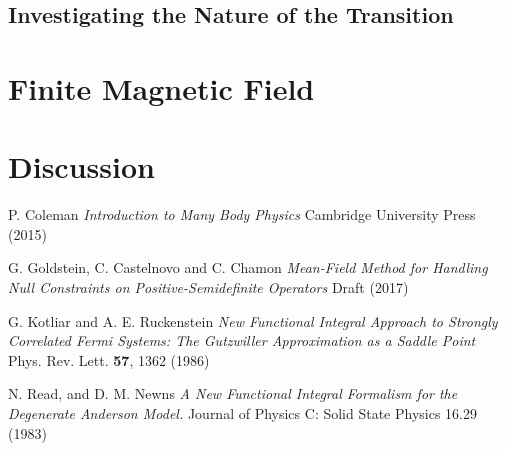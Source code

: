 \documentclass[12pt]{article}
\begin{document}

\subsection{Investigating the Nature of the Transition}


\section{Finite Magnetic Field}


\section{Discussion}



\begin{thebibliography}{1}

P. Coleman
\emph{Introduction to Many Body Physics}
Cambridge University Press (2015)

G. Goldstein, C. Castelnovo and C. Chamon
\emph{Mean-Field Method for Handling Null Constraints on Positive-Semidefinite Operators}
Draft (2017)

G. Kotliar and A. E. Ruckenstein
\emph{New Functional Integral Approach to Strongly Correlated Fermi Systems: The Gutzwiller Approximation as a Saddle Point}
Phys. Rev. Lett. \textbf{57}, 1362 (1986)

N. Read, and D. M. Newns
\emph{A New Functional Integral Formalism for the Degenerate Anderson Model.} Journal of Physics C: Solid State Physics 16.29 (1983)



\end{thebibliography}
\end{document}
